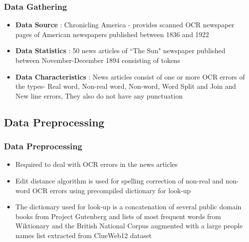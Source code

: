 \documentclass{beamer}
\begin{document}
\begin{frame}

\frametitle{Data Gathering}
\begin{itemize}
 \justifying

\item \textbf{Data Source} : Chronicling America - provides scanned OCR newspaper pages of American newspapers published between 1836 and 1922 
\item \textbf{Data Statistics} : 50 news articles of ``The Sun" newspaper published between November-December 1894 consisting of  tokens
\item \textbf{Data Characteristics} : News articles consist of one or more OCR errors of the types- Real word, Non-real word, Non-word, Word Split and Join and New line errors, They also do not have any punctuation
\end{itemize}


\end{frame} 

\subsection{Data Preprocessing}

\begin{frame}
\frametitle{Data Preprocessing}
\begin{itemize}
 \justifying

\item
Required to deal with OCR errors in the news articles
\item
Edit distance algorithm is used for spelling correction of non-real and non-word OCR errors using precompiled dictionary for look-up
\item
The dictionary used for look-up is a concatenation of several public domain books from Project Gutenberg and lists of most
frequent words from Wiktionary and the British National Corpus augmented with a large people names list extracted from ClueWeb12 dataset
\end{itemize}
\end{frame}
\end{document}
